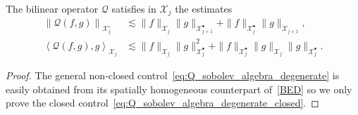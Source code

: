\documentclass[AHL,Unicode,longabstracts,published]{cedram}
\newcommand{\XX}{\mathcal{X}}
\newcommand{\QQ}{\mathcal{Q}}
\newcommand{\SSh}{\bm{\XX}}
\newcommand{\SShp}{\bm{\XX}^{\bullet}}
\newcommand{\SShm}{\bm{\XX}^{\circ}}
\newcommand{\lla}{\left\langle}
\newcommand{\rra}{\right\rangle}
\begin{document}
\begin{lemm}\label{lem72}
The bilinear operator $\QQ$ satisfies in $\SSh_j$ the estimates
\begin{align}
\left\| \QQ(f, g) \right\|_{ \SShm_j } &\lesssim \| f \|_{ \SSh_j } \| g \|_{ \SShp_{j+1} } + \| f \|_{ \SShp_j } \| g \|_{ \SSh_{j+1} },
\label{eq:Q_sobolev_algebra_degenerate}\\
\lla \QQ(f, g), g \rra_{ \SSh_j } &\lesssim \| f \|_{ \SSh_j } \| g \|_{ \SShp_j }^2 + \| f \|_{ \SShp_j } \| g \|_{ \SSh_j } \| g \|_{ \SShp_j }.
\label{eq:Q_sobolev_algebra_degenerate_closed}
\end{align}
\end{lemm}

\begin{proof}
The general non-closed control~\eqref{eq:Q_sobolev_algebra_degenerate} is easily obtained from its spatially homogeneous counterpart of~\eqref{BED} so we only prove the closed control~\eqref{eq:Q_sobolev_algebra_degenerate_closed}.


\end{proof}
\end{document}

